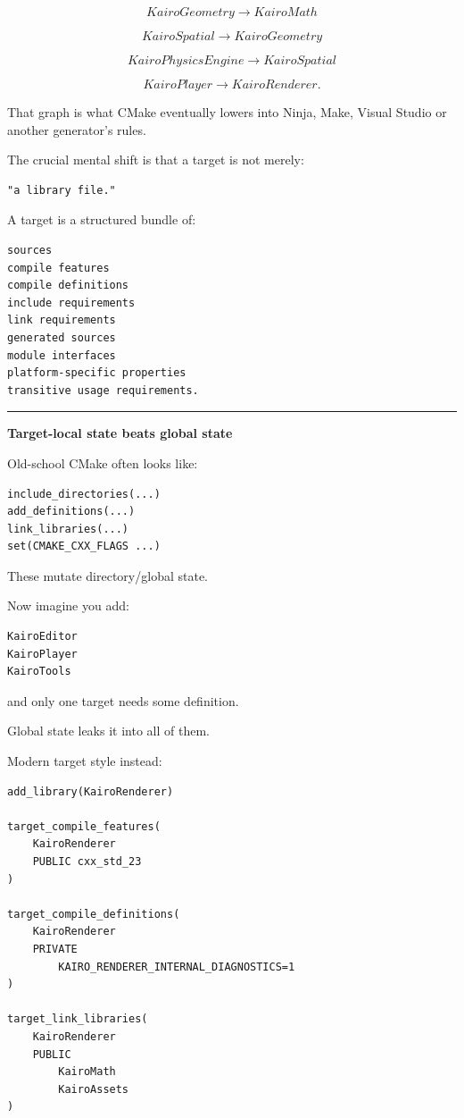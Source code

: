 \[
KairoGeometry\rightarrow KairoMath
\]

\[
KairoSpatial\rightarrow KairoGeometry
\]

\[
KairoPhysicsEngine\rightarrow KairoSpatial
\]

\[
KairoPlayer\rightarrow KairoRenderer.
\]

That graph is what CMake eventually lowers into Ninja, Make, Visual Studio or another generator's rules.

The crucial mental shift is that a target is not merely:

\begin{verbatim}
"a library file."
\end{verbatim}

A target is a structured bundle of:

\begin{verbatim}
sources
compile features
compile definitions
include requirements
link requirements
generated sources
module interfaces
platform-specific properties
transitive usage requirements.
\end{verbatim}

\begin{center}\rule{0.5\linewidth}{0.5pt}\end{center}

\textbf{Target-local state beats global state}

Old-school CMake often looks like:

\begin{verbatim}
include_directories(...)
add_definitions(...)
link_libraries(...)
set(CMAKE_CXX_FLAGS ...)
\end{verbatim}

These mutate directory/global state.

Now imagine you add:

\begin{verbatim}
KairoEditor
KairoPlayer
KairoTools
\end{verbatim}

and only one target needs some definition.

Global state leaks it into all of them.

Modern target style instead:

\begin{verbatim}
add_library(KairoRenderer)

target_compile_features(
    KairoRenderer
    PUBLIC cxx_std_23
)

target_compile_definitions(
    KairoRenderer
    PRIVATE
        KAIRO_RENDERER_INTERNAL_DIAGNOSTICS=1
)

target_link_libraries(
    KairoRenderer
    PUBLIC
        KairoMath
        KairoAssets
)
\end{verbatim}

